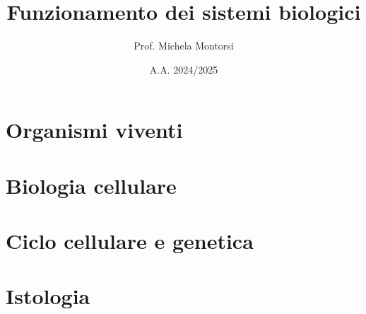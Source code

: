 \documentclass[11pt, oneside, openany]{book}
\title{Funzionamento dei sistemi biologici}
\author{Prof. Michela Montorsi}
\date{A.A. 2024/2025}
\begin{document}
\frontmatter                 %

\maketitle
\thispagestyle{empty}
\clearpage

\tableofcontents
\clearpage

\mainmatter                  %

\chapter{Organismi viventi}






\chapter{Biologia cellulare}
% 

\chapter{Ciclo cellulare e genetica}
% 

\chapter{Istologia}
% 
\end{document}
